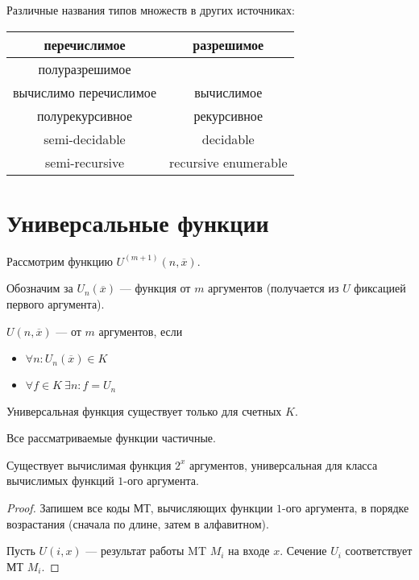 \begin{note}
	Различные названия типов множеств в других источниках:
	\begin{center}
	\begin{tabular}{c|c}
		перечислимое & разрешимое \\
		\hline
		полуразрешимое &   \\
		вычислимо перечислимое & вычислимое \\
		полурекурсивное & рекурсивное \\
		\hline
		semi-decidable & decidable \\
		semi-recursive & recursive 
		enumerable &  \\
    \end{tabular}
	\end{center}
\end{note}


\section{Универсальные функции}
Рассмотрим функцию $ U^{(m+1)}(n, \overline{x})$.

Обозначим за $ U_n(\overline{x})$ --- функция от $ m$ аргументов (получается из $ U$ фиксацией первого аргумента).

\begin{defn}
    $ U(n, \overline{x})$ ---  от $ m$ аргументов, если 
	\begin{itemize}
		\item $ \forall n \colon  U_n(\overline{x}) \in K$
		\item $ \forall f \in K ~ \exists n \colon f = U_{n}$
	\end{itemize}
\end{defn}

\begin{note}
    Универсальная функция существует только для счетных $ K$.
\end{note}
\begin{note}
    Все рассматриваемые функции частичные.
\end{note}


\begin{thm}
    Существует вычислимая функция $ 2^{x}$ аргументов, универсальная для класса вычислимых функций $ 1$-ого аргумента.
\end{thm}
\begin{proof}
	Запишем все коды МТ, вычисляющих функции $ 1$-ого аргумента, в порядке возрастания (сначала по длине, затем в алфавитном).

	Пусть $ U(i, x)$ --- результат работы MT  $ M_i$ на входе $ x$. Сечение $ U_i$ соответствует МТ $ M_i$.
\end{proof}

